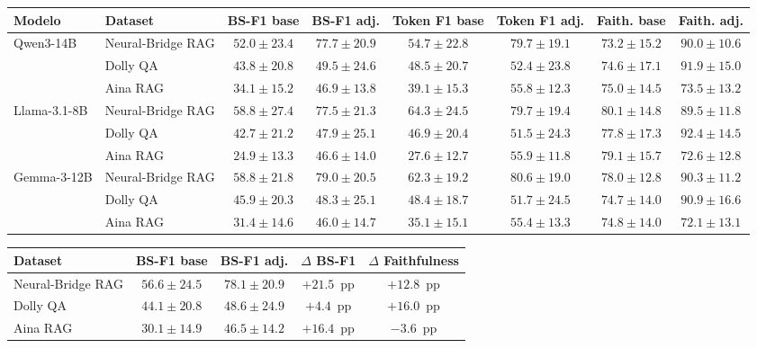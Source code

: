 \begin{tabular}{|l|l|cc|cc|cc|}
\hline
\textbf{Modelo} & \textbf{Dataset} & \textbf{BS-F1 base} & \textbf{BS-F1 adj.} & \textbf{Token F1 base} & \textbf{Token F1 adj.} & \textbf{Faith. base} & \textbf{Faith. adj.} \\
\hline
  \multirow{3}{*}{Qwen3-14B} & Neural-Bridge RAG & $52.0 \pm 23.4$ & $77.7 \pm 20.9$ & $54.7 \pm 22.8$ & $79.7 \pm 19.1$ & $73.2 \pm 15.2$ & $90.0 \pm 10.6$ \\
   & Dolly QA & $43.8 \pm 20.8$ & $49.5 \pm 24.6$ & $48.5 \pm 20.7$ & $52.4 \pm 23.8$ & $74.6 \pm 17.1$ & $91.9 \pm 15.0$ \\
   & Aina RAG & $34.1 \pm 15.2$ & $46.9 \pm 13.8$ & $39.1 \pm 15.3$ & $55.8 \pm 12.3$ & $75.0 \pm 14.5$ & $73.5 \pm 13.2$ \\
\hline
  \multirow{3}{*}{Llama-3.1-8B} & Neural-Bridge RAG & $58.8 \pm 27.4$ & $77.5 \pm 21.3$ & $64.3 \pm 24.5$ & $79.7 \pm 19.4$ & $80.1 \pm 14.8$ & $89.5 \pm 11.8$ \\
   & Dolly QA & $42.7 \pm 21.2$ & $47.9 \pm 25.1$ & $46.9 \pm 20.4$ & $51.5 \pm 24.3$ & $77.8 \pm 17.3$ & $92.4 \pm 14.5$ \\
   & Aina RAG & $24.9 \pm 13.3$ & $46.6 \pm 14.0$ & $27.6 \pm 12.7$ & $55.9 \pm 11.8$ & $79.1 \pm 15.7$ & $72.6 \pm 12.8$ \\
\hline
  \multirow{3}{*}{Gemma-3-12B} & Neural-Bridge RAG & $58.8 \pm 21.8$ & $79.0 \pm 20.5$ & $62.3 \pm 19.2$ & $80.6 \pm 19.0$ & $78.0 \pm 12.8$ & $90.3 \pm 11.2$ \\
   & Dolly QA & $45.9 \pm 20.3$ & $48.3 \pm 25.1$ & $48.4 \pm 18.7$ & $51.7 \pm 24.5$ & $74.7 \pm 14.0$ & $90.9 \pm 16.6$ \\
   & Aina RAG & $31.4 \pm 14.6$ & $46.0 \pm 14.7$ & $35.1 \pm 15.1$ & $55.4 \pm 13.3$ & $74.8 \pm 14.0$ & $72.1 \pm 13.1$ \\
\hline
\end{tabular}

\begin{tabular}{|l|cc|c|c|}
\hline
\textbf{Dataset} & \textbf{BS-F1 base} & \textbf{BS-F1 adj.} & \textbf{$\Delta$ BS-F1} & \textbf{$\Delta$ Faithfulness} \\
\hline
  Neural-Bridge RAG & $56.6 \pm 24.5$ & $78.1 \pm 20.9$ & $+21.5$~pp & $+12.8$~pp \\
  Dolly QA & $44.1 \pm 20.8$ & $48.6 \pm 24.9$ & $+4.4$~pp & $+16.0$~pp \\
  Aina RAG & $30.1 \pm 14.9$ & $46.5 \pm 14.2$ & $+16.4$~pp & $-3.6$~pp \\
\hline
\end{tabular}
